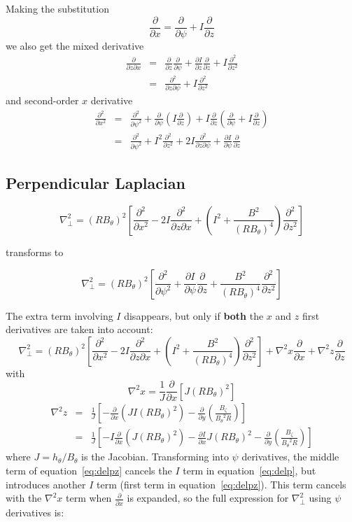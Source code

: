 \documentclass[12pt]{article}
\newcommand{\deriv}[2]{\ensuremath{\frac{\partial #1}{\partial #2}}}
\newcommand{\dderiv}[2]{\ensuremath{\frac{\partial^2 #1}{\partial {#2}^2}}}
\newcommand{\hthe}{\ensuremath{h_\theta}}
\newcommand{\Bp}{\ensuremath{B_\theta}}
\newcommand{\Bt}{\ensuremath{B_\zeta}}
\newcommand{\delp}{\nabla_\perp^2}
\newcommand{\rbp}{\ensuremath{R\Bp}}
\newcommand{\rbpsq}{\ensuremath{\left(\rbp\right)^2}}
\begin{document}
Making the substitution
\begin{equation}
\deriv{}{x} = \deriv{}{\psi} + I\deriv{}{z}
\label{eq:ddx_identity}
\end{equation}
we also get the mixed derivative
\begin{eqnarray}
\frac{\partial}{\partial z\partial x} &=& \deriv{}{z}\deriv{}{\psi} + \deriv{I}{z}\deriv{}{z} + I\frac{\partial^2}{\partial z^2} \nonumber \\
&=& \frac{\partial^2}{\partial z\partial \psi} + I\frac{\partial^2}{\partial z^2}
\end{eqnarray}
and second-order $x$ derivative
\begin{eqnarray}
\frac{\partial^2}{\partial x^2} &=& \frac{\partial^2}{\partial \psi^2} + \deriv{}{\psi}\left(I\deriv{}{z}\right) + I\deriv{}{z}\left(\deriv{}{\psi} + I\deriv{}{z}\right) \nonumber \\
&=& \frac{\partial^2}{\partial \psi^2} + I^2\frac{\partial^2}{\partial z^2} + 2I\frac{\partial^2}{\partial z\partial \psi} + \deriv{I}{\psi}\deriv{}{z}
\end{eqnarray}

\subsection{Perpendicular Laplacian}

\[
\delp = \rbpsq\left[\dderiv{}{x} - 2I\frac{\partial^2}{\partial z\partial x} + \left(I^2 + \frac{B^2}{\left(\rbp\right)^4}\right)\dderiv{}{z}\right]
\]

transforms to

\begin{equation}
\delp = \rbpsq\left[\dderiv{}{\psi} + \deriv{I}{\psi}\deriv{}{z} + \frac{B^2}{\left(\rbp\right)^4}\dderiv{}{z}\right]
\label{eq:delp}
\end{equation}

The extra term involving $I$ disappears, but only if {\bf  both} the $x$ and $z$ first derivatives are taken into account:
\[
\delp = \rbpsq\left[\dderiv{}{x} - 2I\frac{\partial^2}{\partial z\partial x} + \left(I^2 + \frac{B^2}{\left(\rbp\right)^4}\right)\dderiv{}{z}\right] + \nabla^2 x \deriv{}{x} + \nabla^2 z\deriv{}{z} 
\]
with
\[
\nabla^2 x = \frac{1}{J}\deriv{}{x}\left[J\rbpsq\right]
\]
\begin{eqnarray}
\nabla^2 z &=& \frac{1}{J}\left[-\deriv{}{x}\left(JI\rbpsq\right) - \deriv{}{y}\left(\frac{\Bt}{\Bp^2R}\right)\right] \nonumber \\
&=& \frac{1}{J}\left[-I\deriv{}{x}\left(J\rbpsq\right) - \deriv{I}{x}J\rbpsq - \deriv{}{y}\left(\frac{\Bt}{\Bp^2R}\right)\right] \label{eq:delpz}
\end{eqnarray}
where $J=\hthe / \Bp$ is the Jacobian. Transforming into $\psi$ derivatives, the middle term of equation~\ref{eq:delpz} cancels the $I$ term in equation~\ref{eq:delp}, but introduces another $I$ term (first term in equation~\ref{eq:delpz}). This term cancels with the $\nabla^2 x$ term when $\deriv{}{x}$ is expanded, so the full expression for $\delp$ using $\psi$ derivatives is:
\end{document}
